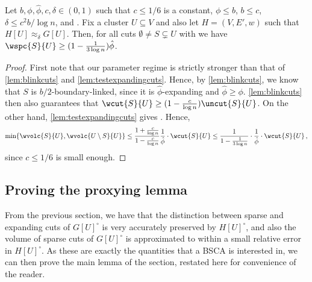\begin{lemma}
	\label{lem:boundlinkexpsparse}
Let $b, \phi,\hat{\phi}, c,\delta \in (0,1)$ such that $c \leq 1/6$ is a constant, $\phi \le b$, $b \le c$, $\delta \le c^2 b/ \log n$, and .  Fix a cluster $U \subseteq V$ and also let $H=(V,E',w)$ such that $H[U] \approx_\delta G[U]$. Then, for all cuts $\emptyset \neq S \subsetneq U$ with  we have $\wspc{S}{U} \geq (1 - \frac{1}{3\log n}) \hat{\phi}$.
\end{lemma}
\begin{proof}
	First note that our parameter regime is strictly stronger than that of \cref{lem:blinkcuts} and \cref{lem:testexpandingcuts}. Hence, by \cref{lem:blinkcuts}, we know that $S$ is $b/2$-boundary-linked, since it is $\hat{\phi}$-expanding and $\hat{\phi} \ge \phi$. \cref{lem:blinkcuts} then also guarantees that $\wcut{S}{U} \ge (1-\frac{c}{\log n}) \uncut{S}{U}$. On the other hand, \cref{lem:testexpandingcuts} gives . Hence,
	\begin{equation*}
		\min \{\wvolc{S}{U},\wvolc{U \setminus S}{U}\} \le \frac{1+\frac{c}{\log n}}{1-\frac{c}{\log n}}\frac{1}{\hat{\phi}} \cdot \wcut{S}{U} \leq  \frac{1}{1-\frac{1}{3\log n}}\cdot \frac{1}{\hat{\phi}} \cdot \wcut{S}{U}  \, ,
	\end{equation*}
since $c \le 1/6$ is small enough.
\end{proof}

\subsection{Proving the proxying lemma}
\label{subsec:proofproxying}
From the previous section, we have that the distinction between sparse and expanding cuts of $G[U]^\circ$ is very accurately preserved by $H[U]^\circ$, and also the volume of sparse cuts of $G[U]^\circ$ is approximated to within a small relative error in $H[U]^\circ$. As these are exactly the quantities that a BSCA is interested in, we can then prove the main lemma of the section, restated here for convenience of the reader.

\reduction*

